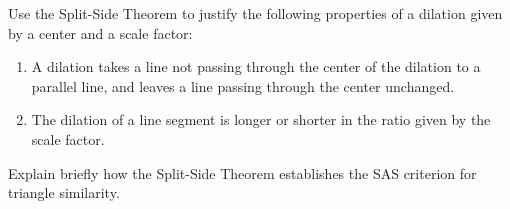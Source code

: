 \documentclass[nooutcomes]{ximera}
\begin{document}
\newpage

\begin{problem}
Use the Split-Side Theorem to justify the following properties of a dilation given by a center and a scale factor:
\begin{enumerate}
\item A dilation takes a line not passing through the center of the dilation to a parallel line, and leaves a line passing through the center unchanged.
\item The dilation of a line segment is longer or shorter in the ratio given by the scale factor.
\end{enumerate}
\vfill
\end{problem}

\begin{problem}
Explain briefly how the Split-Side Theorem establishes the SAS criterion for triangle similarity.  
\vfill
\end{problem}
\end{document}
